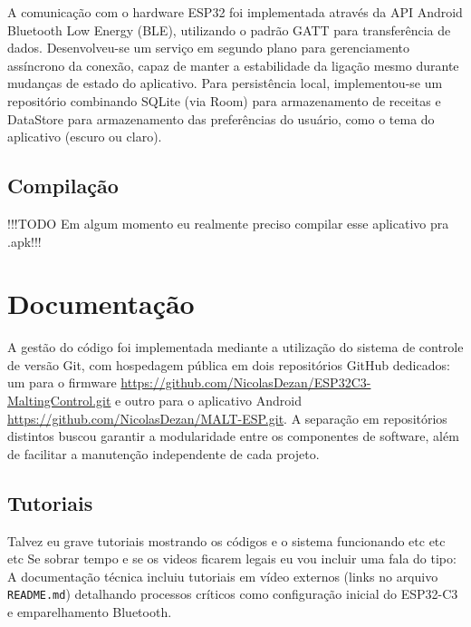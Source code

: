 A comunicação com o hardware ESP32 foi implementada através da API Android Bluetooth Low Energy (BLE), utilizando o padrão GATT para transferência de dados. Desenvolveu-se um serviço em segundo plano para gerenciamento assíncrono da conexão, capaz de manter a estabilidade da ligação mesmo durante mudanças de estado do aplicativo. Para persistência local, implementou-se um repositório combinando SQLite (via Room) para armazenamento de receitas e DataStore para armazenamento das preferências do usuário, como o tema do aplicativo (escuro ou claro).

\subsection{Compilação}

!!!TODO Em algum momento eu realmente preciso compilar esse aplicativo pra .apk!!!



\section{Documentação}
A gestão do código foi implementada mediante a utilização do sistema de controle de versão Git, com hospedagem pública em dois repositórios GitHub dedicados: um para o firmware \url{https://github.com/NicolasDezan/ESP32C3-MaltingControl.git} e outro para o aplicativo Android \url{https://github.com/NicolasDezan/MALT-ESP.git}. A separação em repositórios distintos buscou garantir a modularidade entre os componentes de software, além de facilitar a manutenção independente de cada projeto.

\subsection{Tutoriais}
Talvez eu grave tutoriais mostrando os códigos e o sistema funcionando etc etc etc
Se sobrar tempo e se os videos ficarem legais eu vou incluir uma fala do tipo:
A documentação técnica incluiu tutoriais em vídeo externos (links no arquivo \texttt{README.md}) detalhando processos críticos como configuração inicial do ESP32-C3 e emparelhamento Bluetooth.